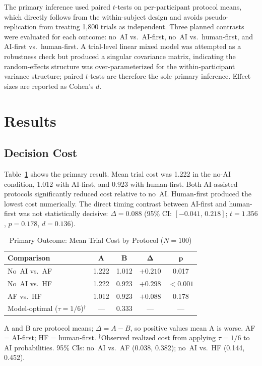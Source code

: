 \documentclass[conference]{IEEEtran}
\begin{document}
The primary inference used paired $t$-tests on per-participant protocol
means, which directly follows from the within-subject design and avoids
pseudo-replication from treating 1,800 trials as independent. Three
planned contrasts were evaluated for each outcome: no~AI vs.\ AI-first,
no~AI vs.\ human-first, and AI-first vs.\ human-first. A trial-level
linear mixed model was attempted as a robustness check but produced a
singular covariance matrix, indicating the random-effects structure was
over-parameterized for the within-participant variance structure; paired
$t$-tests are therefore the sole primary inference. Effect sizes are
reported as Cohen's $d$.

\section{Results}
\label{sec:results}

\subsection{Decision Cost}

Table~\ref{tab:cost} shows the primary result. Mean trial cost was
1.222 in the no-AI condition, 1.012 with AI-first, and 0.923 with
human-first. Both AI-assisted protocols significantly reduced cost
relative to no~AI. Human-first produced the lowest cost numerically.
The direct timing contrast between AI-first and human-first was not
statistically decisive: $\Delta = 0.088$ (95\% CI: $[-0.041,\, 0.218]$;
$t = 1.356$, $p = 0.178$, $d = 0.136$).

\begin{table}[H]
  \centering
  \caption{Primary Outcome: Mean Trial Cost by Protocol ($N=100$)}
  \label{tab:cost}
  \footnotesize
  \setlength{\tabcolsep}{3.2pt}
  \begin{tabular}{@{}lcccc@{}}
    \toprule
    \textbf{Comparison} & \textbf{A} & \textbf{B}
      & $\boldsymbol{\Delta}$ & $\boldsymbol{p}$ \\
    \midrule
    No~AI vs.\ AF & 1.222 & 1.012 & $+0.210$ & 0.017 \\
    No~AI vs.\ HF & 1.222 & 0.923 & $+0.298$ & $<0.001$ \\
    AF vs.\ HF    & 1.012 & 0.923 & $+0.088$ & 0.178 \\
    \midrule
    Model-optimal ($\tau=1/6$)$^\dagger$ & --- & 0.333 & --- & --- \\
    \bottomrule
  \end{tabular}

  \vspace{2pt}
  \parbox{\columnwidth}{\footnotesize
    A and B are protocol means; $\Delta=A-B$, so positive values mean A is worse.
    AF = AI-first; HF = human-first.
    $^\dagger$Observed realized cost from applying $\tau=1/6$ to AI probabilities.
    95\% CIs: no~AI vs.\ AF (0.038, 0.382); no~AI vs.\ HF (0.144, 0.452).
  }
\end{table}
\end{document}

